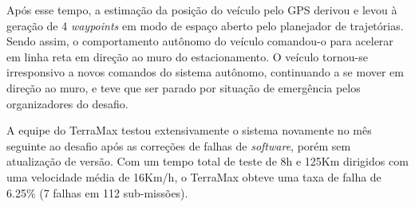 Após esse tempo, a estimação da posição do veículo pelo GPS derivou e levou à geração de 4 \emph{waypoints} em modo de espaço aberto pelo planejador de trajetórias. Sendo assim, o comportamento autônomo do veículo comandou-o para acelerar em linha reta em direção ao muro do estacionamento. O veículo tornou-se irresponsivo a novos comandos do sistema autônomo, continuando a se mover em direção ao muro, e teve que ser parado por situação de emergência pelos organizadores do desafio.

A equipe do TerraMax testou extensivamente o sistema novamente no mês seguinte ao desafio após as correções de falhas de \emph{software}, porém sem atualização de versão. Com um tempo total de teste de 8h e 125Km dirigidos com uma velocidade média de 16Km/h, o TerraMax obteve uma taxa de falha de 6.25\% (7 falhas em 112 sub-missões).





